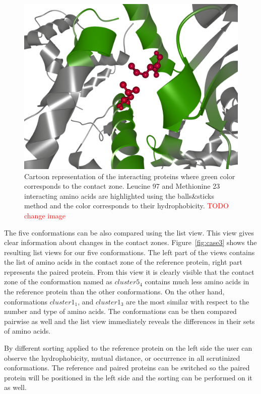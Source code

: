 \documentclass[journal]{vgtc}                %
\begin{document}
\begin{figure}[bt]
  \centering
  \includegraphics[width=0.8\columnwidth]{contact.png}
  \caption{Cartoon representation of the interacting proteins where green color corresponds to the contact zone. Leucine 97 and Methionine 23 interacting amino acids are highlighted using the balls\&sticks method and the color corresponds to their hydrophobicity. \textcolor{red}{TODO change image}}
  \label{fig:contact}
\end{figure}

The five conformations can be also compared using the list view.
This view gives clear information about changes in the contact zones.
Figure~\ref{fig:case3} shows the resulting list views for our five conformations.
The left part of the views contains the list of amino acids in the contact zone of the reference protein, right part represents the paired protein.
From this view it is clearly visible that the contact zone of the conformation named as $cluster5_4$ contains much less amino acids in the reference protein than the other conformations.
On the other hand, conformations $cluster1_1$, and $cluster1_3$ are the most similar with respect to the number and type of amino acids. 
The conformations can be then compared pairwise as well and the list view immediately reveals the differences in their sets of amino acids.

By different sorting applied to the reference protein on the left side the user can observe the hydrophobicity, mutual distance, or occurrence in all scrutinized conformations.
The reference and paired proteins can be switched so the paired protein will be positioned in the left side and the sorting can be performed on it as well.
\end{document}

